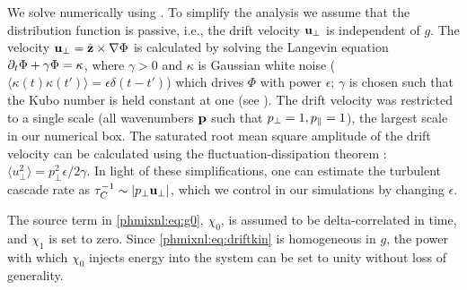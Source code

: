     We solve  numerically using \Gand.
    To simplify the analysis we assume that the distribution function is passive, i.e.,
    the drift velocity $\mathbf{u_\perp}$ is independent of $g$.
    The velocity $\mathbf{u}_\perp=\hat{\mathbf{z}}\times\nabla\Phi$ is
    calculated by solving the Langevin equation $\partial_t
    \Phi + \gamma \Phi = \kappa$, where $\gamma >0$ and $\kappa$ is Gaussian white noise ($\langle \kappa(t) \kappa(t')\rangle =
    \epsilon \delta(t-t')$) which drives $\Phi$ with power $\epsilon$; $\gamma$ is chosen
    such that the Kubo number is held constant at one (see ). The drift velocity
    was restricted to a single scale (all wavenumbers $\mathbf{p}$ such that $p_\perp=1,
    p_\parallel=1$), the largest scale in our numerical box.
    The
    saturated root mean square amplitude of the drift velocity can be calculated using the
    fluctuation-dissipation theorem \cite{kubo66}: $\langle u_\perp^2 \rangle
    = p_\perp^2 \epsilon/2 \gamma$. In light of these simplifications, one can estimate
    the turbulent cascade rate as $\tau_C^{-1}\sim \left|p_\perp \mathbf{u_\perp}\right|$, which we control in our simulations by
    changing $\epsilon$.
    
    The source term in \eqref{phmixnl:eq:g0}, $\chi_0$, is assumed to be delta-correlated
    in time, and
    $\chi_1$ is set to zero. Since \eqref{phmixnl:eq:driftkin} is
    homogeneous in $g$, the power with which $\chi_0$ injects energy into the system can
    be set to unity without loss of generality.

